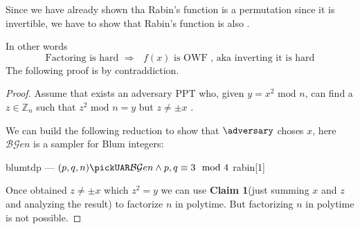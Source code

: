 
Since we have already shown tha Rabin's function is a permutation since it is invertible, we have to show that Rabin's function is also \owf.

In other words
\[
    \text{Factoring is hard } \Rightarrow \text{ $f(x)$ is OWF , aka inverting
    it is hard}
\]
The following proof is by contraddiction.
\begin{proof}
    Assume that exists an adversary PPT who, given $y=x^{2} \text{ mod } n$, can find a $z \in \mathbb{Z}_{n} $ such that $z^{2} \text{ mod } n=y$ but $z\neq \pm x$ .

    We can build the following reduction to show that $\adversary$ choses $x$, here $\mathcal{BG}en$ is a sampler for Blum integers:

    \begin{cryptoredux}
        {blumtdp}
        {---}
        {$(p, q, n) \pickUAR \mathcal{BG}en \wedge p,q \equiv 3 \mod 4$}
        {rabin}[1]



        
    \end{cryptoredux}

    
    Once obtained $z\neq \pm x$ which $z^{2}=y$ we can use \textbf{Claim 1}(just summing $x$ and $z$ and analyzing the result)  to factorize $n$ in polytime. But factorizing $n$ in polytime is not possible.
\end{proof}
